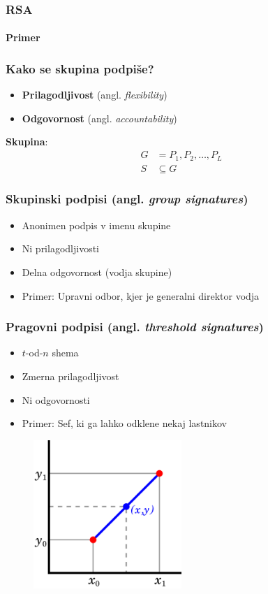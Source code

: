 \documentclass{beamer}    %
\begin{document}
\begin{frame}
    \frametitle{RSA}
    \framesubtitle{Primer}
\end{frame}

\begin{frame}
    \frametitle{Kako se skupina podpiše?}
    \begin{itemize}
        \item \textbf{Prilagodljivost} (angl. \textit{flexibility})
        \item \textbf{Odgovornost} (angl. \textit{accountability})
    \end{itemize}
    \vspace{1cm}
    \textbf{Skupina}: 
    \begin{align*}
        G &= P_1, P_2, \dots, P_L \\
        S &\subseteq G
    \end{align*}
\end{frame}

\begin{frame}
    \frametitle{Skupinski podpisi (angl. \textit{group signatures})}
    \begin{itemize}
        \item Anonimen podpis v imenu skupine
        \item Ni prilagodljivosti
        \item Delna odgovornost (vodja skupine)
        \item Primer: Upravni odbor, kjer je generalni direktor vodja
    \end{itemize}
\end{frame}

\begin{frame}
    \frametitle{Pragovni podpisi (angl. \textit{threshold signatures})}
    \begin{multicols*}{2}
        \begin{itemize}
            \item $t$-od-$n$ shema
            \item Zmerna prilagodljivost
            \item Ni odgovornosti
            \item Primer: Sef, ki ga lahko odklene nekaj lastnikov
        \end{itemize}
    \begin{figure}
        \includegraphics[width=0.5\textwidth]{images/interpolation.png}
    \end{figure}
    \end{multicols*}
\end{frame}
\end{document}
